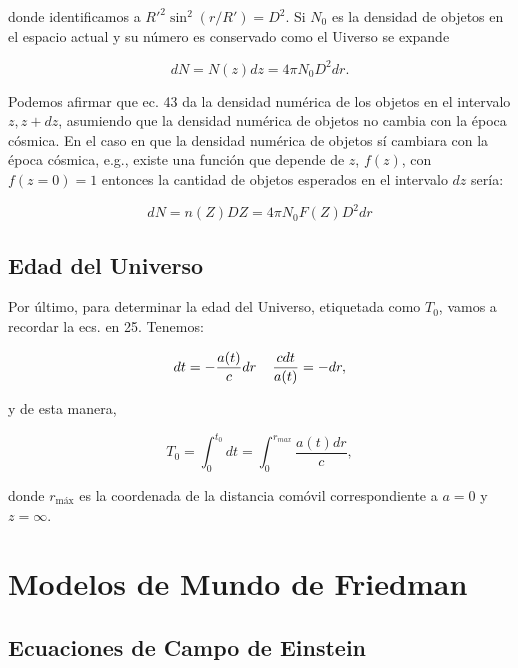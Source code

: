 \documentclass[11pt]{article}
\begin{document}
    donde identificamos a $R'^2 \sin^2 (r/R') = D^2$. Si $N_0$ es la densidad de objetos en el espacio actual y su número es conservado como el Uiverso se expande 

    \begin{equation}
        dN = N(z) dz = 4\pi N_0 D^2 dr. 
    \end{equation}

    Podemos afirmar que ec. 43 da la densidad numérica de los objetos en el intervalo $z, z +dz$, asumiendo que la densidad numérica de objetos no cambia con la época cósmica. En el caso en que la densidad numérica de objetos sí cambiara con la época cósmica, e.g., existe una función que depende de $z$, $f(z)$, con $f(z=0) =1$ entonces la cantidad de objetos esperados en el intervalo $dz$ sería: 

    \begin{equation}
        dN= n(Z) DZ = 4\pi N_0 F(Z) D^2 dr
    \end{equation}



\subsection{Edad del Universo}

    Por último, para determinar la edad del Universo, etiquetada como $T_0$, vamos a recordar la ecs. en 25. Tenemos:


    \begin{equation}
        dt = - \frac{a(t)}{c} dr \hspace{0.4cm} \frac{c dt}{a(t)} = -dr,
    \end{equation} 

    y de esta manera, 

    \begin{equation}
        T_0 = \int_0^{t_0}{dt } = \int_0^{r_{max}}{\frac{a(t) dr}{c}},
    \end{equation}
    
    donde $r_{{\text{máx}}}$ es la coordenada de la distancia comóvil correspondiente a $a=0$ y $z = \infty$.
    
    
    \section{Modelos de Mundo de Friedman}
    
    
    \subsection{Ecuaciones de Campo de Einstein}
    
\end{document}
